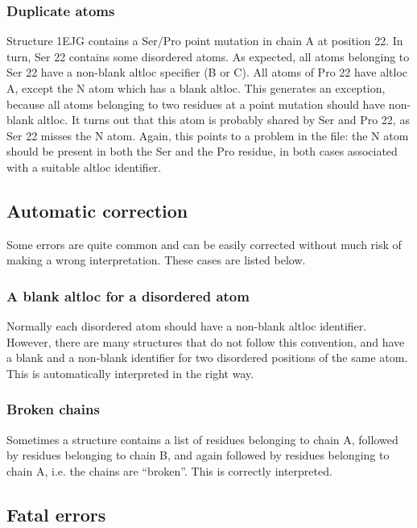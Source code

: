 \subsubsection{Duplicate atoms}

Structure 1EJG contains a Ser/Pro point mutation in chain A at position 22.
In turn, Ser 22 contains some disordered atoms. As expected, all atoms belonging
to Ser 22 have a non-blank altloc specifier (B or C). All atoms of Pro 22 have
altloc A, except the N atom which has a blank altloc. This generates an exception,
because all atoms belonging to two residues at a point mutation should have
non-blank altloc. It turns out that this atom is probably shared by Ser and
Pro 22, as Ser 22 misses the N atom. Again, this points to a problem in the
file: the N atom should be present in both the Ser and the Pro residue, in both
cases associated with a suitable altloc identifier.

\subsection{Automatic correction}

Some errors are quite common and can be easily corrected without much risk of
making a wrong interpretation. These cases are listed below.

\subsubsection{A blank altloc for a disordered atom}

Normally each disordered atom should have a non-blank altloc identifier. However,
there are many structures that do not follow this convention, and have a blank
and a non-blank identifier for two disordered positions of the same atom. This
is automatically interpreted in the right way.

\subsubsection{Broken chains}

Sometimes a structure contains a list of residues belonging to chain A, followed
by residues belonging to chain B, and again followed by residues belonging to
chain A, i.e. the chains are ``broken''. This is correctly interpreted.

\subsection{Fatal errors}

